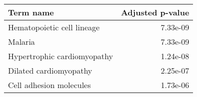 \begin{tabular}{lr}
\toprule
                   Term name &  Adjusted p-value \\
\midrule
  Hematopoietic cell lineage &          7.33e-09 \\
                     Malaria &          7.33e-09 \\
 Hypertrophic cardiomyopathy &          1.24e-08 \\
      Dilated cardiomyopathy &          2.25e-07 \\
     Cell adhesion molecules &          1.73e-06 \\
\bottomrule
\end{tabular}
